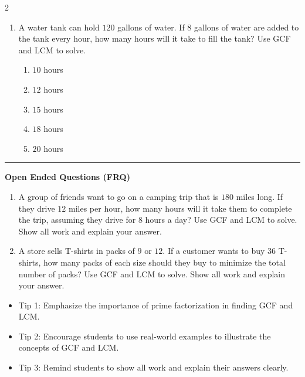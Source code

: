\documentclass[10pt]{article}
\begin{document}
\begin{multicols}{2}
\begin{enumerate}[label=\textbf{Q\arabic*.}, leftmargin=*, itemsep=6pt, parsep=0pt]
  \item \small A water tank can hold $120$ gallons of water. If $8$ gallons of water are added to the tank every hour, how many hours will it take to fill the tank? Use GCF and LCM to solve.
  \begin{enumerate}[label=(\Alph*), leftmargin=0.6cm, nosep, itemsep=2pt]
    \item $10$ hours
    \item $12$ hours
    \item $15$ hours
    \item $18$ hours
    \item $20$ hours
  \end{enumerate}

\end{enumerate}
\end{multicols}

\vspace{-0.2cm}
\hrule
\vspace{0.2cm}
\textbf{\small Open Ended Questions (FRQ)}
\begin{enumerate}[label=\textbf{Q\arabic*.}, start=9, itemsep=5pt, topsep=0pt]

  \item \small A group of friends want to go on a camping trip that is $180$ miles long. If they drive $12$ miles per hour, how many hours will it take them to complete the trip, assuming they drive for $8$ hours a day? Use GCF and LCM to solve. Show all work and explain your answer. \vspace{2cm}

  \item \small A store sells T-shirts in packs of $9$ or $12$. If a customer wants to buy $36$ T-shirts, how many packs of each size should they buy to minimize the total number of packs? Use GCF and LCM to solve. Show all work and explain your answer. \vspace{2cm}

\end{enumerate}

\vfill

\begin{tcolorbox}[colback=blue!5, colframe=mainblue!50, title=\small \textbf{Chef's Tips}, fonttitle=\bfseries, bottom=1mm]
\begin{itemize}[noitemsep, topsep=2pt, leftmargin=0.5cm]
  \item \scriptsize Tip 1: Emphasize the importance of prime factorization in finding GCF and LCM.\item \scriptsize Tip 2: Encourage students to use real-world examples to illustrate the concepts of GCF and LCM.\item \scriptsize Tip 3: Remind students to show all work and explain their answers clearly.
\end{itemize}
\end{tcolorbox}
\end{document}
